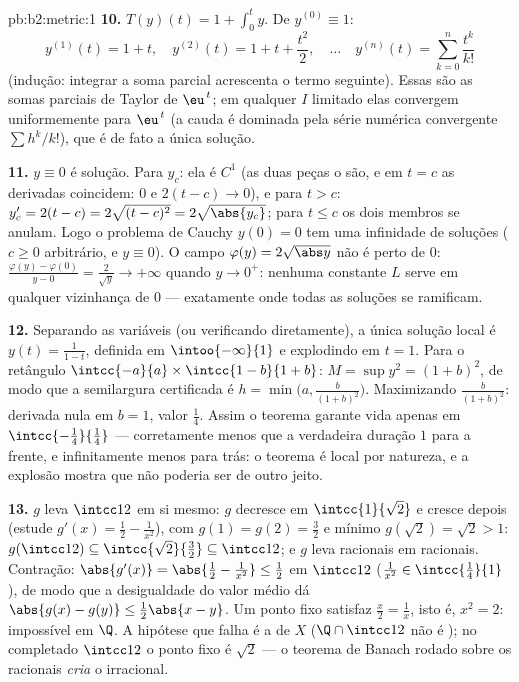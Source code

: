 \begin{solution}{pb:b2:metric:1}
\textbf{10.} $T(y)(t) = 1 + \int_0^t y$. De $y^{(0)} \equiv
1$:
\[
y^{(1)}(t) = 1 + t,\quad
y^{(2)}(t) = 1 + t + \frac{t^2}2,\quad\dots\quad
y^{(n)}(t) = \sum_{k=0}^{n}\frac{t^k}{k!}
\]
(indução: integrar a soma parcial acrescenta o termo seguinte).
Essas são as somas parciais de Taylor de $\eu^{\,t}$; em qualquer
$I$ limitado elas convergem uniformemente para $\eu^{\,t}$ (a cauda é
dominada pela série numérica convergente $\sum h^k/k!$),
que é de fato a única solução.

\textbf{11.} $y \equiv 0$ é solução. Para $y_c$: ela é $C^1$
(as duas peças o são, e em $t = c$ as derivadas coincidem: $0$ e
$2(t - c) \to 0$), e para $t > c$: $y_c' = 2(t - c) =
2\sqrt{(t-c)^2} = 2\sqrt{\abs{y_c}}$; para $t \leq c$ os dois membros
se anulam. Logo o problema de Cauchy $y(0) = 0$ tem uma infinidade de
soluções ($c \geq 0$ arbitrário, e $y \equiv 0$). O campo
$\varphi(y) = 2\sqrt{\abs y}$ não é  perto de $0$:
$\frac{\varphi(y) - \varphi(0)}{y - 0} = \frac{2}{\sqrt y} \to
+\infty$ quando $y \to 0^+$: nenhuma constante $L$ serve em qualquer
vizinhança de $0$ --- exatamente onde todas as soluções
se ramificam.

\textbf{12.} Separando as variáveis (ou verificando diretamente), a
única solução local é $y(t) = \frac1{1 - t}$, definida em
$\intoo{-\infty}{1}$ e explodindo em $t = 1$. Para o
retângulo $\intcc{-a}{a} \times \intcc{1 - b}{1 + b}$: $M =
\sup y^2 = (1 + b)^2$, de modo que a semilargura certificada é $h =
\min\bigl(a, \frac{b}{(1+b)^2}\bigr)$. Maximizando
$\frac{b}{(1+b)^2}$: derivada nula em $b = 1$, valor
$\frac14$. Assim o teorema garante vida apenas em
$\intcc{-\frac14}{\frac14}$ --- corretamente menos que a verdadeira
duração $1$ para a frente, e infinitamente menos para trás: o teorema
é local por natureza, e a explosão mostra que não poderia ser de outro jeito.

\textbf{13.} $g$ leva $\intcc12$ em si mesmo: $g$ decresce em
$\intcc{1}{\sqrt2}$ e cresce depois (estude $g'(x) = \frac12
- \frac1{x^2}$), com $g(1) = g(2) = \frac32$ e mínimo
$g(\sqrt2) = \sqrt2 > 1$: $g(\intcc12) \subseteq
\intcc{\sqrt2}{\frac32} \subseteq \intcc12$; e $g$ leva
racionais em racionais. Contração: $\abs{g'(x)} = \abs{\frac12
- \frac1{x^2}} \leq \frac12$ em $\intcc12$ ($\frac1{x^2} \in
\intcc{\frac14}{1}$), de modo que a desigualdade do valor médio dá
$\abs{g(x) - g(y)} \leq \frac12\abs{x - y}$. Um ponto fixo
satisfaz $\frac x2 = \frac1x$, isto é, $x^2 = 2$: impossível em
$\Q$. A hipótese que falha é a  de $X$ ($\Q \cap
\intcc12$ não é ); no completado $\intcc12$ o
ponto fixo é $\sqrt2$ --- o teorema de Banach rodado sobre os
racionais \emph{cria} o irracional.


\end{solution}
